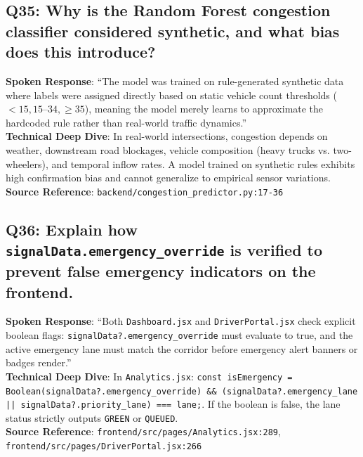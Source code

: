 \documentclass[11pt,a4paper,oneside]{report}
\begin{document}
\subsection*{Q35: Why is the Random Forest congestion classifier considered synthetic, and what bias does this introduce?}
\begin{interviewbox}
\textbf{Spoken Response}: ``The model was trained on rule-generated synthetic data where labels were assigned directly based on static vehicle count thresholds ($<15, 15\text{--}34, \ge 35$), meaning the model merely learns to approximate the hardcoded rule rather than real-world traffic dynamics.''\\
\textbf{Technical Deep Dive}: In real-world intersections, congestion depends on weather, downstream road blockages, vehicle composition (heavy trucks vs. two-wheelers), and temporal inflow rates. A model trained on synthetic rules exhibits high confirmation bias and cannot generalize to empirical sensor variations.\\
\textbf{Source Reference}: \texttt{backend/congestion\_predictor.py:17-36}
\end{interviewbox}

\subsection*{Q36: Explain how \texttt{signalData.emergency\_override} is verified to prevent false emergency indicators on the frontend.}
\begin{interviewbox}
\textbf{Spoken Response}: ``Both \texttt{Dashboard.jsx} and \texttt{DriverPortal.jsx} check explicit boolean flags: \texttt{signalData?.emergency\_override} must evaluate to true, and the active emergency lane must match the corridor before emergency alert banners or badges render.''\\
\textbf{Technical Deep Dive}: In \texttt{Analytics.jsx}: \texttt{const isEmergency = Boolean(signalData?.emergency\_override) \&\& (signalData?.emergency\_lane || signalData?.priority\_lane) === lane;}. If the boolean is false, the lane status strictly outputs \texttt{GREEN} or \texttt{QUEUED}.\\
\textbf{Source Reference}: \texttt{frontend/src/pages/Analytics.jsx:289}, \texttt{frontend/src/pages/DriverPortal.jsx:266}
\end{interviewbox}
\end{document}
